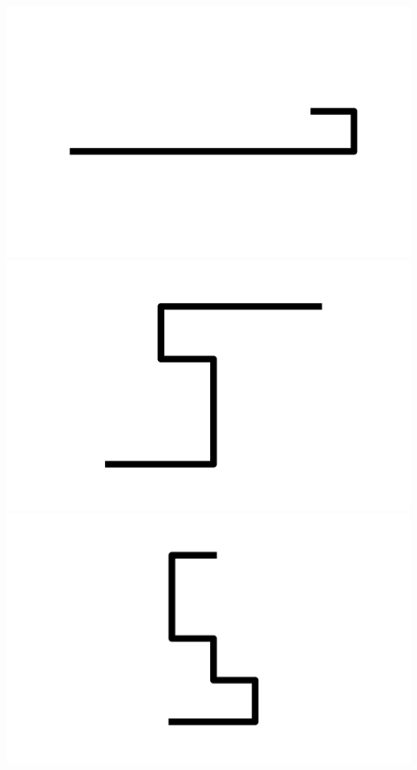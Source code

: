 \documentclass[]{report}
\begin{document}
\includegraphics[scale=.1]{pictures/21/state_cluster_shapes_391.pdf} 
\includegraphics[scale=.1]{pictures/21/state_cluster_shapes_392.pdf} 
\includegraphics[scale=.1]{pictures/21/state_cluster_shapes_393.pdf} 
\end{document}
